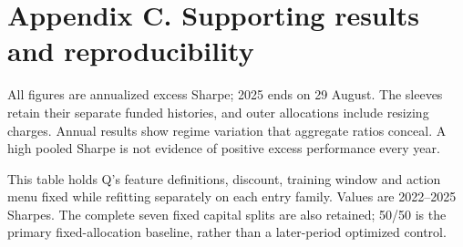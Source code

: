 \documentclass[11pt,letterpaper]{article}
\begin{document}
\section*{Appendix C. Supporting results and reproducibility}
\begin{center}\small{}\end{center}
All figures are annualized excess Sharpe; 2025 ends on 29 August. The sleeves retain their separate funded histories, and outer allocations include resizing charges. Annual results show regime variation that aggregate ratios conceal. A high pooled Sharpe is not evidence of positive excess performance every year.

\begin{center}\small{}\end{center}
This table holds Q's feature definitions, discount, training window and action menu fixed while refitting separately on each entry family. Values are 2022--2025 Sharpes. The complete seven fixed capital splits are also retained; 50/50 is the primary fixed-allocation baseline, rather than a later-period optimized control.
\end{document}
